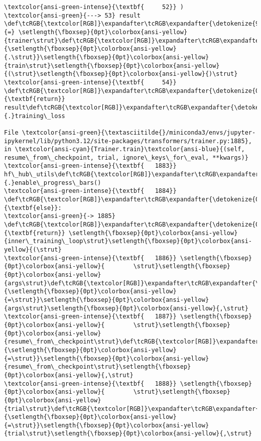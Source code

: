 \documentclass[11pt]{article}
\begin{document}
\begin{Verbatim}[commandchars=\\\{\}, frame=single, framerule=2mm, rulecolor=\color{outerrorbackground}]
\textcolor{ansi-green-intense}{\textbf{     52}} )
\textcolor{ansi-green}{---> 53} result \def\tcRGB{\textcolor[RGB]}\expandafter\tcRGB\expandafter{\detokenize{98,98,98}}{=} \setlength{\fboxsep}{0pt}\colorbox{ansi-yellow}{trainer\strut}\def\tcRGB{\textcolor[RGB]}\expandafter\tcRGB\expandafter{\detokenize{98,98,98}}{\setlength{\fboxsep}{0pt}\colorbox{ansi-yellow}{.\strut}}\setlength{\fboxsep}{0pt}\colorbox{ansi-yellow}{train\strut}\setlength{\fboxsep}{0pt}\colorbox{ansi-yellow}{(\strut}\setlength{\fboxsep}{0pt}\colorbox{ansi-yellow}{)\strut}
\textcolor{ansi-green-intense}{\textbf{     54}} \def\tcRGB{\textcolor[RGB]}\expandafter\tcRGB\expandafter{\detokenize{0,135,0}}{\textbf{return}} result\def\tcRGB{\textcolor[RGB]}\expandafter\tcRGB\expandafter{\detokenize{98,98,98}}{.}training\_loss

File \textcolor{ansi-green}{\textasciitilde{}/miniconda3/envs/jupyter-ipykernel/lib/python3.12/site-packages/transformers/trainer.py:1885}, in \textcolor{ansi-cyan}{Trainer.train}\textcolor{ansi-blue}{(self, resume\_from\_checkpoint, trial, ignore\_keys\_for\_eval, **kwargs)}
\textcolor{ansi-green-intense}{\textbf{   1883}}         hf\_hub\_utils\def\tcRGB{\textcolor[RGB]}\expandafter\tcRGB\expandafter{\detokenize{98,98,98}}{.}enable\_progress\_bars()
\textcolor{ansi-green-intense}{\textbf{   1884}} \def\tcRGB{\textcolor[RGB]}\expandafter\tcRGB\expandafter{\detokenize{0,135,0}}{\textbf{else}}:
\textcolor{ansi-green}{-> 1885}     \def\tcRGB{\textcolor[RGB]}\expandafter\tcRGB\expandafter{\detokenize{0,135,0}}{\textbf{return}} \setlength{\fboxsep}{0pt}\colorbox{ansi-yellow}{inner\_training\_loop\strut}\setlength{\fboxsep}{0pt}\colorbox{ansi-yellow}{(\strut}
\textcolor{ansi-green-intense}{\textbf{   1886}} \setlength{\fboxsep}{0pt}\colorbox{ansi-yellow}{        \strut}\setlength{\fboxsep}{0pt}\colorbox{ansi-yellow}{args\strut}\def\tcRGB{\textcolor[RGB]}\expandafter\tcRGB\expandafter{\detokenize{98,98,98}}{\setlength{\fboxsep}{0pt}\colorbox{ansi-yellow}{=\strut}}\setlength{\fboxsep}{0pt}\colorbox{ansi-yellow}{args\strut}\setlength{\fboxsep}{0pt}\colorbox{ansi-yellow}{,\strut}
\textcolor{ansi-green-intense}{\textbf{   1887}} \setlength{\fboxsep}{0pt}\colorbox{ansi-yellow}{        \strut}\setlength{\fboxsep}{0pt}\colorbox{ansi-yellow}{resume\_from\_checkpoint\strut}\def\tcRGB{\textcolor[RGB]}\expandafter\tcRGB\expandafter{\detokenize{98,98,98}}{\setlength{\fboxsep}{0pt}\colorbox{ansi-yellow}{=\strut}}\setlength{\fboxsep}{0pt}\colorbox{ansi-yellow}{resume\_from\_checkpoint\strut}\setlength{\fboxsep}{0pt}\colorbox{ansi-yellow}{,\strut}
\textcolor{ansi-green-intense}{\textbf{   1888}} \setlength{\fboxsep}{0pt}\colorbox{ansi-yellow}{        \strut}\setlength{\fboxsep}{0pt}\colorbox{ansi-yellow}{trial\strut}\def\tcRGB{\textcolor[RGB]}\expandafter\tcRGB\expandafter{\detokenize{98,98,98}}{\setlength{\fboxsep}{0pt}\colorbox{ansi-yellow}{=\strut}}\setlength{\fboxsep}{0pt}\colorbox{ansi-yellow}{trial\strut}\setlength{\fboxsep}{0pt}\colorbox{ansi-yellow}{,\strut}

\end{Verbatim}
\end{document}
